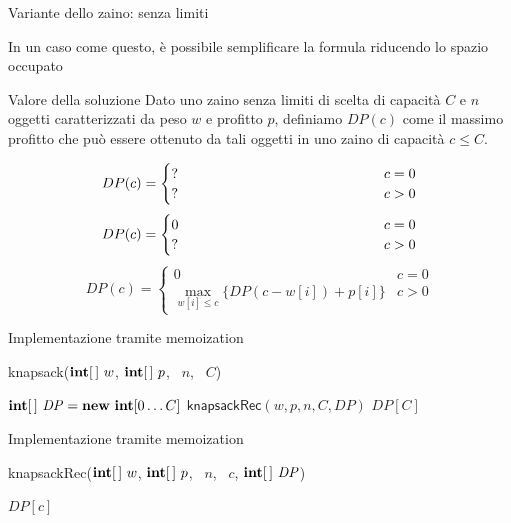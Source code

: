\begin{frame}{Variante dello zaino: senza limiti}

In un caso come questo, è possibile semplificare la formula riducendo
lo spazio occupato

\bigskip
\begin{block}{Valore della soluzione}
Dato uno zaino senza limiti di scelta di capacità $C$ e $n$ oggetti caratterizzati
da peso $w$ e profitto $p$, definiamo $\mathit{DP}(c)$ come il
massimo profitto che può essere ottenuto da tali oggetti
in uno zaino di capacità $c \leq  C$.
\end{block}

\begin{overprint}
\[
DP(c) = \begin{cases}
  \makebox[5cm][l]{?} & c=0 \\
  \makebox[5cm][l]{?} & c>0
\end{cases}
\]
\[
DP(c) = \begin{cases}
  0 & c=0 \\
  \makebox[5cm][l]{?} & c>0
\end{cases}
\]
\[
DP(c) = \begin{cases}
  0 & c=0 \\
  \max_{w[i] \leq c} \{ \mathit{DP}(c-w[i])+p[i] \} & c>0
\end{cases}
\]
\end{overprint}

\end{frame}

\begin{frame}{Implementazione tramite memoization}

\begin{Procedure}
\caption[A]{\textsf{knapsack}($\INTEGER[\,]\ w$, $\INTEGER[\,]\ p$, \INTEGER\ $n$, \INTEGER\ $C$)}
  $\INTEGER[\,]\ \mathit{DP} = \NEW\ \INTEGER[0 \ldots C]$\;
  $\textsf{knapsackRec}(w, p, n, C, \mathit{DP})$\;
  \Return $\mathit{DP}[C]$\;
\end{Procedure}
\end{frame}
  
\begin{frame}{Implementazione tramite memoization}

\begin{Procedure}
\caption[A]{\textsf{knapsackRec}($\INTEGER[\,]\ w$, $\INTEGER[\,]\ p$, \INTEGER\ $n$, \INTEGER\ $c$, $\INTEGER[\,]\ \mathit{DP}$)}
\Return $\mathit{DP}[c]$\;
\end{Procedure}
\end{frame}

